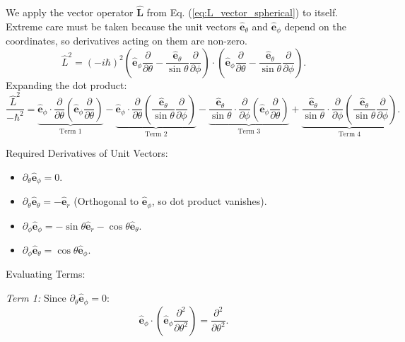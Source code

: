 We apply the vector operator $\hat{\mathbf{L}}$ from
Eq. (\ref{eq:L_vector_spherical}) to itself. Extreme care must be taken because
the unit vectors $\hat{\mathbf{e}}_\theta$ and $\hat{\mathbf{e}}_\phi$ depend on
the coordinates, so derivatives acting on them are non-zero.
\begin{equation}
  \hat{L}^2 = (-i\hbar)^2 \left( \hat{\mathbf{e}}_\phi \frac{\partial}{\partial
  \theta} - \frac{\hat{\mathbf{e}}_\theta}{\sin\theta} \frac{\partial}{\partial
  \phi} \right) \cdot \left( \hat{\mathbf{e}}_\phi \frac{\partial}{\partial
  \theta} - \frac{\hat{\mathbf{e}}_\theta}{\sin\theta} \frac{\partial}{\partial
  \phi} \right).
\end{equation}
Expanding the dot product:
\begin{equation}
  \frac{\hat{L}^2}{-\hbar^2} = \underbrace{\hat{\mathbf{e}}_\phi \cdot
  \frac{\partial}{\partial \theta} \left( \hat{\mathbf{e}}_\phi
  \frac{\partial}{\partial \theta} \right)}_{\text{Term 1}}
  - \underbrace{\hat{\mathbf{e}}_\phi \cdot \frac{\partial}{\partial \theta}
  \left( \frac{\hat{\mathbf{e}}_\theta}{\sin\theta} \frac{\partial}{\partial
  \phi} \right)}_{\text{Term 2}}
  - \underbrace{\frac{\hat{\mathbf{e}}_\theta}{\sin\theta} \cdot
  \frac{\partial}{\partial \phi} \left( \hat{\mathbf{e}}_\phi
  \frac{\partial}{\partial \theta} \right)}_{\text{Term 3}}
  + \underbrace{\frac{\hat{\mathbf{e}}_\theta}{\sin\theta} \cdot
  \frac{\partial}{\partial \phi} \left( \frac{\hat{\mathbf{e}}_\theta}
  {\sin\theta} \frac{\partial}{\partial \phi} \right)}_{\text{Term 4}}.
\end{equation}

Required Derivatives of Unit Vectors:
\begin{itemize}
  \item $\partial_\theta \hat{\mathbf{e}}_\phi = 0$.
  \item $\partial_\theta \hat{\mathbf{e}}_\theta = -\hat{\mathbf{e}}_r$
  (Orthogonal to $\hat{\mathbf{e}}_\phi$, so dot product vanishes).
  \item $\partial_\phi \hat{\mathbf{e}}_\phi = -\sin\theta \hat{\mathbf{e}}_r -
  \cos\theta \hat{\mathbf{e}}_\theta$.
  \item $\partial_\phi \hat{\mathbf{e}}_\theta = \cos\theta
  \hat{\mathbf{e}}_\phi$.
\end{itemize}

Evaluating Terms:

\textit{Term 1:} Since $\partial_\theta \hat{\mathbf{e}}_\phi = 0$:
\[ \hat{\mathbf{e}}_\phi \cdot \left( \hat{\mathbf{e}}_\phi
\frac{\partial^2}{\partial \theta^2} \right) = \frac{\partial^2}{\partial
\theta^2}. \]


